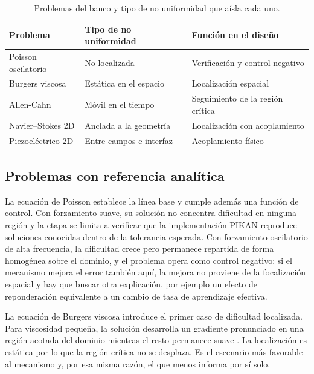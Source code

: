\begin{table}[htbp]
\centering
\caption{Problemas del banco y tipo de no uniformidad que aísla cada uno.}
\label{tab:escalera}
\begin{tabular}{lll}
\toprule
Problema & Tipo de no uniformidad & Función en el diseño \\
\midrule
Poisson oscilatorio & No localizada           & Verificación y control negativo \\
Burgers viscosa     & Estática en el espacio  & Localización espacial \\
Allen-Cahn          & Móvil en el tiempo      & Seguimiento de la región crítica \\
Navier--Stokes 2D   & Anclada a la geometría  & Localización con acoplamiento \\
Piezoeléctrico 2D   & Entre campos e interfaz & Acoplamiento físico \\
\bottomrule
\end{tabular}
\end{table}


\subsection{Problemas con referencia analítica}

La ecuación de Poisson establece la línea base y cumple además una
función de control. Con forzamiento suave, su solución no concentra
dificultad en ninguna región y la etapa se limita a verificar que la
implementación PIKAN reproduce soluciones conocidas dentro de la
tolerancia esperada. Con forzamiento oscilatorio de alta frecuencia, la
dificultad crece pero permanece repartida de forma homogénea sobre el
dominio, y el problema opera como control negativo: si el mecanismo
mejora el error también aquí, la mejora no proviene de la focalización
espacial y hay que buscar otra explicación, por ejemplo un efecto de
reponderación equivalente a un cambio de tasa de aprendizaje efectiva.

La ecuación de Burgers viscosa introduce el primer caso de dificultad
localizada. Para viscosidad pequeña, la solución desarrolla un gradiente
pronunciado en una región acotada del dominio mientras el resto permanece
suave \cite{raissi2019}. La localización es estática por lo que la región
crítica no se desplaza. Es el escenario más favorable al mecanismo y, por
esa misma razón, el que menos informa por sí solo.

